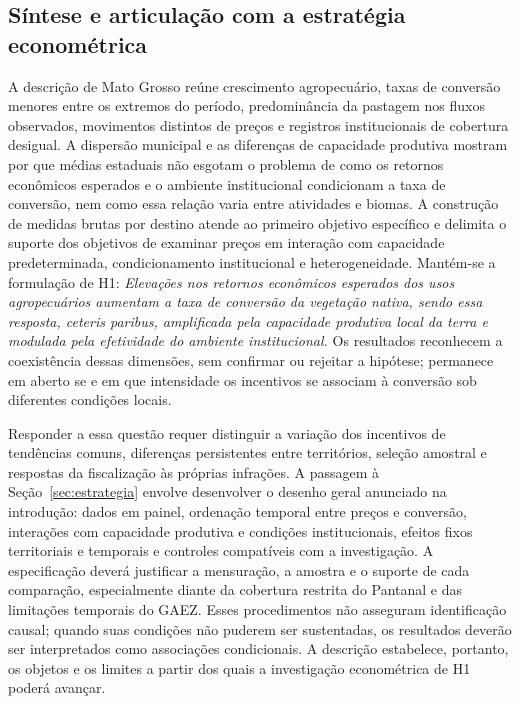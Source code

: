 \subsection{Síntese e articulação com a estratégia econométrica}
\label{subsec:mt-sintese}

A descrição de Mato Grosso reúne crescimento agropecuário, taxas de conversão menores entre os extremos do período, predominância da pastagem nos fluxos observados, movimentos distintos de preços e registros institucionais de cobertura desigual. A dispersão municipal e as diferenças de capacidade produtiva mostram por que médias estaduais não esgotam o problema de como os retornos econômicos esperados e o ambiente institucional condicionam a taxa de conversão, nem como essa relação varia entre atividades e biomas. A construção de medidas brutas por destino atende ao primeiro objetivo específico e delimita o suporte dos objetivos de examinar preços em interação com capacidade predeterminada, condicionamento institucional e heterogeneidade. Mantém-se a formulação de H1: \emph{Elevações nos retornos econômicos esperados dos usos agropecuários aumentam a taxa de conversão da vegetação nativa, sendo essa resposta, \textit{ceteris paribus}, amplificada pela capacidade produtiva local da terra e modulada pela efetividade do ambiente institucional.} Os resultados reconhecem a coexistência dessas dimensões, sem confirmar ou rejeitar a hipótese; permanece em aberto se e em que intensidade os incentivos se associam à conversão sob diferentes condições locais.

Responder a essa questão requer distinguir a variação dos incentivos de tendências comuns, diferenças persistentes entre territórios, seleção amostral e respostas da fiscalização às próprias infrações. A passagem à Seção~\ref{sec:estrategia} envolve desenvolver o desenho geral anunciado na introdução: dados em painel, ordenação temporal entre preços e conversão, interações com capacidade produtiva e condições institucionais, efeitos fixos territoriais e temporais e controles compatíveis com a investigação. A especificação deverá justificar a mensuração, a amostra e o suporte de cada comparação, especialmente diante da cobertura restrita do Pantanal e das limitações temporais do GAEZ. Esses procedimentos não asseguram identificação causal; quando suas condições não puderem ser sustentadas, os resultados deverão ser interpretados como associações condicionais. A descrição estabelece, portanto, os objetos e os limites a partir dos quais a investigação econométrica de H1 poderá avançar.

\endgroup

